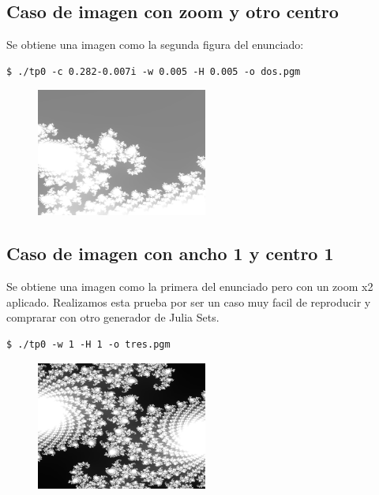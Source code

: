 \documentclass[a4paper,10pt]{article}
\begin{document}
\newpage

\subsection{Caso de imagen con zoom y otro centro}
Se obtiene una imagen como la segunda figura del enunciado:

\begin{lstlisting}[frame=single]
$ ./tp0 -c 0.282-0.007i -w 0.005 -H 0.005 -o dos.pgm
\end{lstlisting}

\begin{figure}[H]
\begin{center}
\includegraphics[width=0.5\textwidth]{imagenes/dos.png}
\caption{} \label{dos}
\end{center}
\end{figure}

\subsection{Caso de imagen con ancho 1 y centro 1}
Se obtiene una imagen como la primera del enunciado pero con un zoom x2 aplicado.
Realizamos esta prueba por ser un caso muy facil de reproducir y comprarar con otro generador de Julia Sets.

\begin{lstlisting}[frame=single]
$ ./tp0 -w 1 -H 1 -o tres.pgm
\end{lstlisting}

\begin{figure}[H]
\begin{center}
\includegraphics[width=0.5\textwidth]{imagenes/tres.png}
\caption{} \label{tres}
\end{center}
\end{figure}
\end{document}
